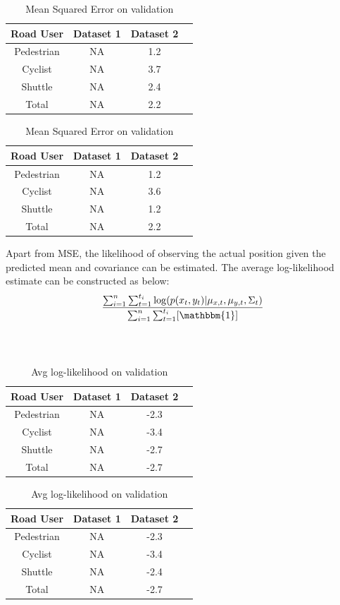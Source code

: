 \documentclass{article}
\begin{document}
\begin{table}[H]
\parbox{.45\linewidth}{
\centering
\begin{tabular}{@{}cccc@{}}
\toprule
Road User & Dataset 1 & Dataset 2 \\ \midrule
Pedestrian  & NA & 1.2 \\ 
Cyclist  & NA & 3.7 \\
Shuttle  & NA & 2.4 \\  \midrule
Total & NA & 2.2 \\    \midrule
\end{tabular}
\caption{Mean Squared Error on test}
\label{table:1}
}
\hfill
\parbox{.45\linewidth}{
\centering
\begin{tabular}{@{}cccc@{}}
\toprule
Road User & Dataset 1 & Dataset 2 \\ \midrule
Pedestrian  & NA & 1.2 \\ 
Cyclist  & NA & 3.6 \\
Shuttle  & NA & 1.2 \\  \midrule
Total & NA & 2.2 \\    \midrule
\end{tabular}
\caption{Mean Squared Error on validation}
\label{table:2}
}
\end{table}
Apart from MSE, the likelihood of observing the actual position given the predicted mean and covariance can be estimated. The average log-likelihood estimate can be constructed as below:
\begin{equation}
    \frac{\sum_{i=1}^n\sum_{t=1}^{t_i}\log(p(x_t,y_t)|\mu_{x,t},\mu_{y,t},\Sigma_t)}{\sum_{i=1}^n\sum_{t=1}^{t_i}[\mathbbm{1}]}
\end{equation}
\\
\\

\begin{table}[H]
\parbox{.45\linewidth}{
\centering
\begin{tabular}{@{}cccc@{}}
\toprule
Road User & Dataset 1 & Dataset 2 \\ \midrule
Pedestrian  & NA & -2.3 \\ 
Cyclist  & NA & -3.4 \\
Shuttle  & NA & -2.7 \\  \midrule
Total & NA & -2.7 \\    \midrule
\end{tabular}
\caption{Avg log-likelihood on test}
\label{table:3}
}
\hfill
\parbox{.5\linewidth}{
\centering
\begin{tabular}{@{}cccc@{}}
\toprule
Road User & Dataset 1 & Dataset 2 \\ \midrule
Pedestrian  & NA & -2.3 \\ 
Cyclist  & NA & -3.4 \\
Shuttle  & NA & -2.4 \\  \midrule
Total & NA & -2.7 \\    \midrule
\end{tabular}
\caption{Avg log-likelihood on validation}
\label{table:4}
}
\end{table}
\end{document}
